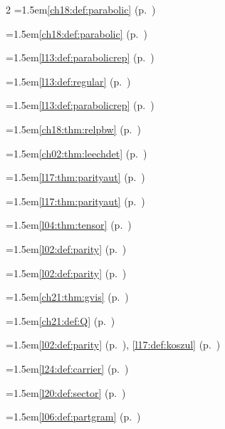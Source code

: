 \begin{multicols}{2}
\hangindent=1.5em\quad \ref{ch18:def:parabolic} (p.~\pageref{ch18:def:parabolic})\par
\hangindent=1.5em\quad \ref{ch18:def:parabolic} (p.~\pageref{ch18:def:parabolic})\par
\hangindent=1.5em\quad \ref{l13:def:parabolicrep} (p.~\pageref{l13:def:parabolicrep})\par
\hangindent=1.5em\quad \ref{l13:def:regular} (p.~\pageref{l13:def:regular})\par
\hangindent=1.5em\quad \ref{l13:def:parabolicrep} (p.~\pageref{l13:def:parabolicrep})\par
\hangindent=1.5em\quad \ref{ch18:thm:relpbw} (p.~\pageref{ch18:thm:relpbw})\par
\hangindent=1.5em\quad \ref{ch02:thm:leechdet} (p.~\pageref{ch02:thm:leechdet})\par
\hangindent=1.5em\quad \ref{l17:thm:parityaut} (p.~\pageref{l17:thm:parityaut})\par
\hangindent=1.5em\quad \ref{l17:thm:parityaut} (p.~\pageref{l17:thm:parityaut})\par
\hangindent=1.5em\quad \ref{l04:thm:tensor} (p.~\pageref{l04:thm:tensor})\par
\hangindent=1.5em\quad \ref{l02:def:parity} (p.~\pageref{l02:def:parity})\par
\hangindent=1.5em\quad \ref{l02:def:parity} (p.~\pageref{l02:def:parity})\par
\hangindent=1.5em\quad \ref{ch21:thm:gvis} (p.~\pageref{ch21:thm:gvis})\par
\hangindent=1.5em\quad \ref{ch21:def:Q} (p.~\pageref{ch21:def:Q})\par
\hangindent=1.5em\quad \ref{l02:def:parity} (p.~\pageref{l02:def:parity}), \ref{l17:def:koszul} (p.~\pageref{l17:def:koszul})\par
\hangindent=1.5em\quad \ref{l24:def:carrier} (p.~\pageref{l24:def:carrier})\par
\hangindent=1.5em\quad \ref{l20:def:sector} (p.~\pageref{l20:def:sector})\par
\hangindent=1.5em\quad \ref{l06:def:partgram} (p.~\pageref{l06:def:partgram})\par

\end{multicols}
